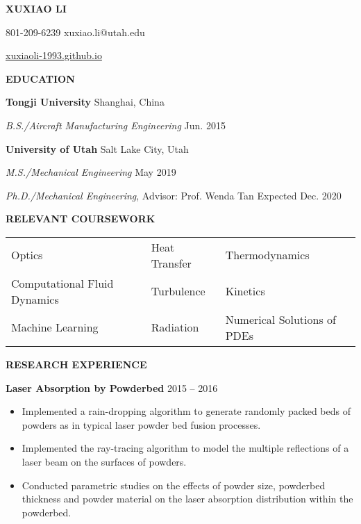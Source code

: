 \documentclass[12pt, letterpaper]{article}
\begin{document}
\begin{center}
   \textbf{\large XUXIAO LI}

   801-209-6239 \textbar{} xuxiao.li@utah.edu

   \href{xuxiaoli-1993.github.io}{xuxiaoli-1993.github.io}
   \paraspace
\end{center}

\textbf{EDUCATION}

\fullrule

\textbf{Tongji University} 
\hfill
Shanghai, China

\textit{B.S./Aircraft Manufacturing Engineering} \hfill Jun. 2015

\vspace{6pt}
\textbf{University of Utah} \hfill Salt Lake City, Utah

\textit{M.S./Mechanical Engineering} \hfill May 2019

\textit{Ph.D./Mechanical Engineering}, Advisor: Prof. Wenda Tan \hfill Expected Dec. 2020 
\vskip 11pt

\textbf{RELEVANT COURSEWORK}

\fullrule
\vspace{3pt}
\begin{tabular}{@{} p{} p{} p{} @{}}
   Optics & Heat Transfer & Thermodynamics \\
   Computational Fluid Dynamics & Turbulence & Kinetics \\
   Machine Learning & Radiation & Numerical Solutions of PDEs
\end{tabular}
\vspace{9pt}

\textbf{RESEARCH EXPERIENCE}

\fullrule
\textbf{Laser Absorption by Powderbed} \hfill 2015 -- 2016
\begin{itemize}[leftmargin=*, labelsep=5mm]
   \item Implemented a rain-dropping algorithm to generate randomly packed beds of powders as in
      typical laser powder bed fusion processes.
   \item Implemented the ray-tracing algorithm to model the multiple reflections of a laser beam on
      the surfaces of powders.
   \item Conducted parametric studies on the effects of powder size, powderbed thickness and powder
      material on the laser absorption distribution within the powderbed.
\end{itemize}
\end{document}
